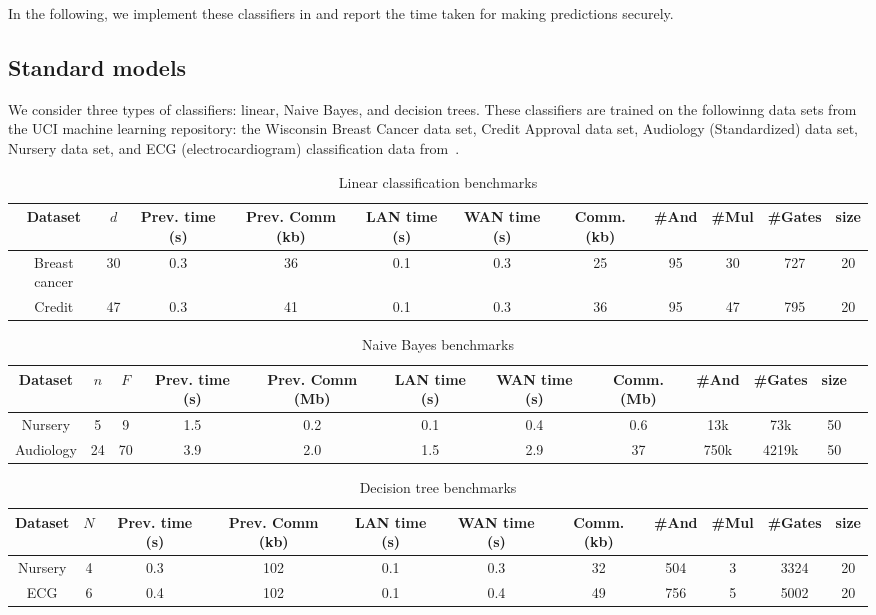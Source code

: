 In the following, we implement these classifiers in \tool and report the time taken for making predictions securely.

\subsection{Standard models}
\label{sec:shallow}
We consider three types of classifiers: linear, Naive Bayes, and decision trees. 
These classifiers are trained on the followinng data sets from the UCI  machine learning repository:
 the Wisconsin Breast Cancer data set, 
Credit Approval data set, Audiology (Standardized) data set, Nursery data set, and
ECG (electrocardiogram) classification data from~\cite{barni}.

\begin{table*}
\begin{tabular}{c|c|c|c|c |c|c|c|c|c|c}
Dataset & $d$  & Prev. time (s) & Prev. Comm (kb) & LAN time (s) & WAN time (s) & Comm. (kb)  & \#And & \#Mul & \#Gates & size\\
\hline
Breast cancer & 30 & 0.3 & 36 & 0.1 & 0.3 & 25 & 95 & 30 & 727 & 20\\
\hline
Credit & 47 & 0.3 & 41 & 0.1 & 0.3 & 36 & 95 & 47 & 795 & 20\\
\hline
\end{tabular}

 \caption{Linear classification benchmarks}
 \label{tab:lc} 
\end{table*}

\begin{table*}
\begin{tabular}{c|c|c|c|c|c |c|c|c|c|c|c}
Dataset & $n$ & $F$ & Prev. time (s) & Prev. Comm (Mb) & LAN time (s) & WAN time (s) & Comm. (Mb)  & \#And  & \#Gates  & size\\
\hline
Nursery & 5 & 9 & 1.5 & 0.2 & 0.1 & 0.4 & 0.6 & 13k  & 73k & 50\\
\hline
Audiology & 24 & 70 & 3.9 & 2.0 & 1.5 & 2.9 & 37 & 750k & 4219k & 50\\
\hline
\end{tabular}

 \caption{Naive Bayes benchmarks}
 \label{tab:nb} 
\end{table*}

\begin{table*}
\begin{tabular}{c|c|c|c |c|c|c|c|c|c|c}
Dataset  & $N$ & Prev. time (s) & Prev. Comm (kb) & LAN time (s) & WAN time (s) & Comm. (kb)  & \#And & \#Mul & \#Gates & size\\
\hline
Nursery & 4 & 0.3 & 102 & 0.1 & 0.3 & 32 & 504 & 3 & 3324 & 20\\
\hline
ECG &  6 & 0.4 & 102 & 0.1 & 0.4 & 49 & 756 & 5 & 5002 & 20\\
\hline
\end{tabular}

 \caption{Decision tree benchmarks}
 \label{tab:dt} 
\end{table*}


